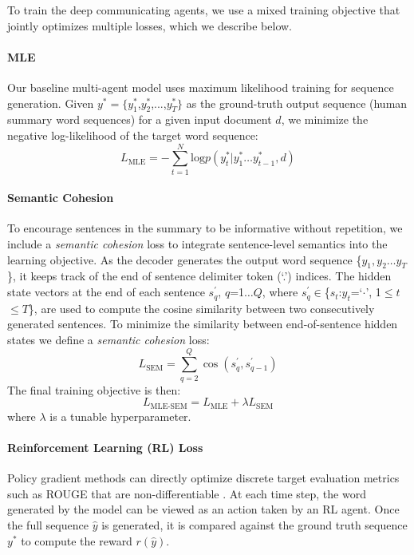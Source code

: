 \documentclass[11pt,a4paper]{article}
\begin{document}
To train the deep communicating agents, we use a mixed training objective that jointly optimizes multiple losses, which we describe below.

\paragraph{MLE}
Our baseline multi-agent model uses maximum likelihood training for sequence generation. Given $y^*=\{y_1^*$,$y_2^*$,...,$y_T^*\}$ as the ground-truth output sequence (human summary word sequences) for a given input document $d$, we minimize the negative log-likelihood of the target word sequence:
\begin{equation}
L_{\text{MLE}}=-\textstyle \sum_{t=1}^N\text{log} p(y_t^*|y_1^*\dots y_{t-1}^*, d)
\label{lossmle}
\end{equation}
\paragraph{Semantic Cohesion}
To encourage sentences in the summary to be informative without repetition, 
we include a \emph{semantic cohesion} loss to integrate sentence-level semantics into the learning objective. 
As the decoder generates the output word sequence \{$y_1,y_2\dots y_{T}$\}, it keeps track of the end of sentence delimiter token (`.') indices. 
The hidden state vectors at the end of each sentence $s^{\prime}_{q}$, $q$=1$\dots Q$, where $s^{\prime}_{q}$$\in$\{$s_t$:$y_t$=`$\cdot$', 1$\leq$$t$$\leq$$T$\}, are used to compute the cosine similarity between two consecutively generated sentences. 
To minimize the similarity between end-of-sentence hidden states we define a \emph{semantic cohesion} loss: 
\begin{equation}
L_{\text{SEM}} =\textstyle \sum_{q=2}^{Q} \cos (s^{\prime}_{q}, s^{\prime}_{q-1}) 
\end{equation}
The final training objective is then:
\vspace*{-1mm}
\begin{equation}
L_{\text{MLE-SEM}} = L_{\text{MLE}} +\lambda L_{\text{SEM}} 
\end{equation}
where $\lambda$ is a tunable hyperparameter. 
\paragraph{Reinforcement Learning (RL) Loss}
Policy gradient methods can directly optimize discrete target evaluation metrics such as ROUGE that are non-differentiable \cite{rlsummsocher,seqtutor,scvc,googlemt}. At each time step, the word generated by the model can be viewed as an action taken by an RL agent.
Once the full sequence $\hat{y}$ is generated, it is compared against the ground truth sequence $y^*$ to compute the reward $r(\hat{y})$. 
\end{document}
